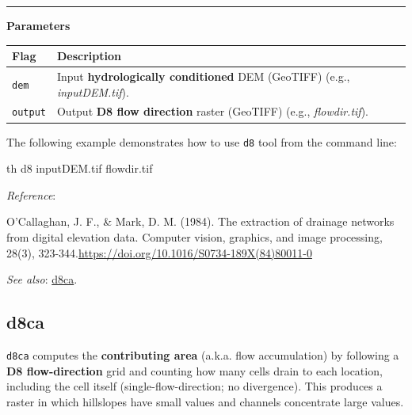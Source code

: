 \documentclass[
]{book}
\newenvironment{Shaded}{\begin{snugshade}}{\end{snugshade}}
\newcommand{\ExtensionTok}[1]{#1}
\newcommand{\NormalTok}[1]{#1}
\theoremstyle{definition}
\theoremstyle{definition}
\theoremstyle{definition}
\theoremstyle{definition}
\theoremstyle{remark}
\begin{document}
\begin{center}\rule{0.5\linewidth}{0.5pt}\end{center}

\textbf{Parameters}

\begin{longtable}[]{@{}
  >{\raggedright\arraybackslash}p{}
  >{\raggedright\arraybackslash}p{}@{}}
\toprule\noalign{}
\begin{minipage}[b]{\linewidth}\raggedright
Flag
\end{minipage} & \begin{minipage}[b]{\linewidth}\raggedright
Description
\end{minipage} \\
\midrule\noalign{}
\endhead
\bottomrule\noalign{}
\endlastfoot
\texttt{dem} & Input \textbf{hydrologically conditioned} DEM (GeoTIFF) (e.g., \emph{inputDEM.tif}). \\
\texttt{output} & Output \textbf{D8 flow direction} raster (GeoTIFF) (e.g., \emph{flowdir.tif}). \\
\end{longtable}

The following example demonstrates how to use \texttt{d8} tool from the command line:

\begin{Shaded}
\begin{Highlighting}[]
\ExtensionTok{th}\NormalTok{ d8 inputDEM.tif flowdir.tif}
\end{Highlighting}
\end{Shaded}

\emph{Reference}:

O'Callaghan, J. F., \& Mark, D. M. (1984). The extraction of drainage networks from digital elevation data. Computer vision, graphics, and image processing, 28(3), 323-344.\url{https://doi.org/10.1016/S0734-189X(84)80011-0}

\emph{See also}: \hyperref[d8ca]{d8ca}.

\subsection{d8ca}\label{d8ca}

\texttt{d8ca} computes the \textbf{contributing area} (a.k.a. flow accumulation) by following a \textbf{D8 flow-direction} grid and counting how many cells drain to each location, including the cell itself (single-flow-direction; no divergence). This produces a raster in which hillslopes have small values and channels concentrate large values.
\end{document}
